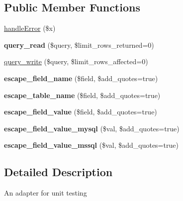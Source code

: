 \subsection*{\-Public \-Member \-Functions}
\begin{DoxyCompactItemize}
\item 
\hyperlink{class_ac_adapter_test_aeeee23d0e38616ec3b791724797a7ec3}{handle\-Error} (\$x)
\item 
\hypertarget{class_ac_adapter_test_a15017b3c0d06c7835f53d80d1120c6d8}{{\bfseries query\-\_\-read} (\$query, \$limit\-\_\-rows\-\_\-returned=0)}\label{class_ac_adapter_test_a15017b3c0d06c7835f53d80d1120c6d8}

\item 
\hyperlink{class_ac_adapter_test_a88b72551fdaca2b723311529f7ba8f3e}{query\-\_\-write} (\$query, \$limit\-\_\-rows\-\_\-affected=0)
\item 
\hypertarget{class_ac_adapter_test_a507156ce9b650fc46643590b2e779742}{{\bfseries escape\-\_\-field\-\_\-name} (\$field, \$add\-\_\-quotes=true)}\label{class_ac_adapter_test_a507156ce9b650fc46643590b2e779742}

\item 
\hypertarget{class_ac_adapter_test_aa8dffaf4018c2981010b9f9cdf66fd0d}{{\bfseries escape\-\_\-table\-\_\-name} (\$field, \$add\-\_\-quotes=true)}\label{class_ac_adapter_test_aa8dffaf4018c2981010b9f9cdf66fd0d}

\item 
\hypertarget{class_ac_adapter_test_a0c6e0af397fa013d20122f6ed136f8da}{{\bfseries escape\-\_\-field\-\_\-value} (\$field, \$add\-\_\-quotes=true)}\label{class_ac_adapter_test_a0c6e0af397fa013d20122f6ed136f8da}

\item 
\hypertarget{class_ac_adapter_test_abf0fe85a87fbbed006220c4cbe5d24d8}{{\bfseries escape\-\_\-field\-\_\-value\-\_\-mysql} (\$val, \$add\-\_\-quotes=true)}\label{class_ac_adapter_test_abf0fe85a87fbbed006220c4cbe5d24d8}

\item 
\hypertarget{class_ac_adapter_test_a537387ce84661403862cc959cd5640b0}{{\bfseries escape\-\_\-field\-\_\-value\-\_\-mssql} (\$val, \$add\-\_\-quotes=true)}\label{class_ac_adapter_test_a537387ce84661403862cc959cd5640b0}

\end{DoxyCompactItemize}


\subsection{\-Detailed \-Description}
\-An adapter for unit testing

